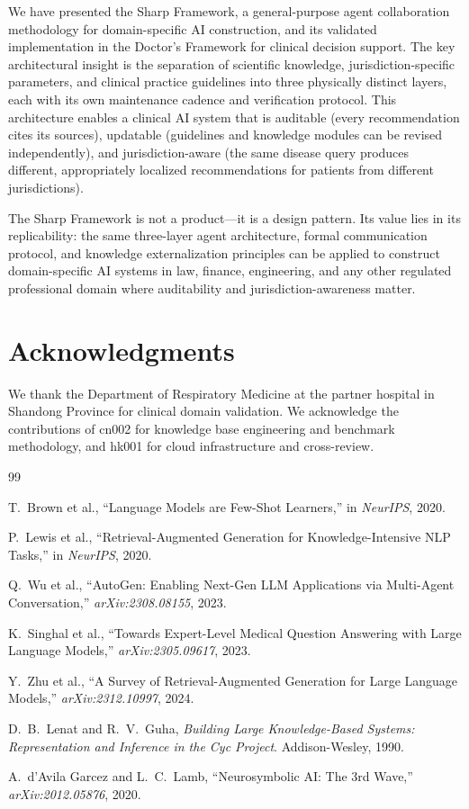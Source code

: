 \documentclass[11pt]{article}
\begin{document}
We have presented the Sharp Framework, a general-purpose agent 
collaboration methodology for domain-specific AI construction, and its 
validated implementation in the Doctor's Framework for clinical decision 
support. The key architectural insight is the separation of scientific 
knowledge, jurisdiction-specific parameters, and clinical practice 
guidelines into three physically distinct layers, each with its own 
maintenance cadence and verification protocol. This architecture enables 
a clinical AI system that is auditable (every recommendation cites its 
sources), updatable (guidelines and knowledge modules can be revised 
independently), and jurisdiction-aware (the same disease query produces 
different, appropriately localized recommendations for patients from 
different jurisdictions).

The Sharp Framework is not a product---it is a design pattern. Its value 
lies in its replicability: the same three-layer agent architecture, 
formal communication protocol, and knowledge externalization principles 
can be applied to construct domain-specific AI systems in law, finance, 
engineering, and any other regulated professional domain where 
auditability and jurisdiction-awareness matter.

\section*{Acknowledgments}

We thank the Department of Respiratory Medicine at the partner hospital 
in Shandong Province for clinical domain validation. We acknowledge the 
contributions of cn002 for knowledge base engineering and benchmark 
methodology, and hk001 for cloud infrastructure and cross-review.

\begin{thebibliography}{99}

T.~Brown et al., ``Language Models are Few-Shot Learners,'' in 
\textit{NeurIPS}, 2020.

P.~Lewis et al., ``Retrieval-Augmented Generation for Knowledge-Intensive 
NLP Tasks,'' in \textit{NeurIPS}, 2020.

Q.~Wu et al., ``AutoGen: Enabling Next-Gen LLM Applications via Multi-Agent 
Conversation,'' \textit{arXiv:2308.08155}, 2023.

K.~Singhal et al., ``Towards Expert-Level Medical Question Answering with 
Large Language Models,'' \textit{arXiv:2305.09617}, 2023.

Y.~Zhu et al., ``A Survey of Retrieval-Augmented Generation for Large 
Language Models,'' \textit{arXiv:2312.10997}, 2024.

D.~B.~Lenat and R.~V.~Guha, \textit{Building Large Knowledge-Based Systems: 
Representation and Inference in the Cyc Project}. Addison-Wesley, 1990.

A.~d'Avila Garcez and L.~C.~Lamb, ``Neurosymbolic AI: The 3rd Wave,'' 
\textit{arXiv:2012.05876}, 2020.

\end{thebibliography}
\end{document}
